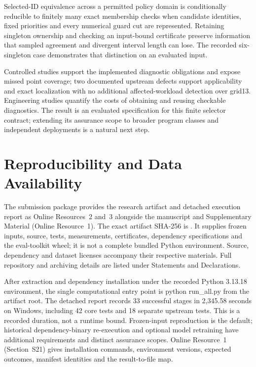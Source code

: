 \documentclass[11pt,a4paper]{article}
\begin{document}
Selected-ID equivalence across a permitted policy domain is conditionally reducible to finitely many exact membership checks when candidate identities, fixed priorities and every numerical guard cut are represented. Retaining singleton ownership and checking an input-bound certificate preserve information that sampled agreement and divergent interval length can lose. The recorded six-singleton case demonstrates that distinction on an evaluated input.

Controlled studies support the implemented diagnostic obligations and expose missed point coverage; two documented upstream defects support applicability and exact localization with no additional affected-workload detection over grid13. Engineering studies quantify the costs of obtaining and reusing checkable diagnostics. The result is an evaluated specification for this finite selector contract; extending its assurance scope to broader program classes and independent deployments is a natural next step.


\section{Reproducibility and Data Availability}

The submission package provides the research artifact and detached execution report as Online Resources~2 and~3 alongside the manuscript and Supplementary Material (Online Resource~1). The exact artifact SHA-256 is \texttt{}. It supplies frozen inputs, source, tests, measurements, certificates, dependency specifications and the eval-toolkit wheel; it is not a complete bundled Python environment. Source, dependency and dataset licenses accompany their respective materials. Full repository and archiving details are listed under Statements and Declarations.

After extraction and dependency installation under the recorded Python 3.13.18 environment, the single computational entry point is python run\_all.py from the artifact root. The detached report records 33 successful stages in 2,345.58 seconds on Windows, including 42 core tests and 18 separate upstream tests. This is a recorded duration, not a runtime bound. Frozen-input reproduction is the default; historical dependency-binary re-execution and optional model retraining have additional requirements and distinct assurance scopes. Online Resource~1 (Section~S21) gives installation commands, environment versions, expected outcomes, manifest identities and the result-to-file map.
\end{document}
